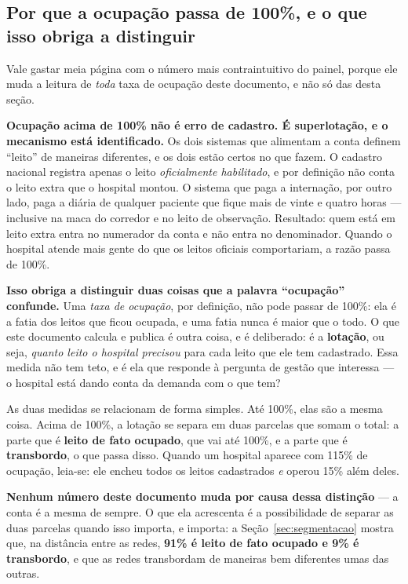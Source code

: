 \subsection*{Por que a ocupação passa de 100\%, e o que isso obriga a
distinguir}
\label{sub:lotacao}

Vale gastar meia página com o número mais contraintuitivo do painel, porque
ele muda a leitura de \emph{toda} taxa de ocupação deste documento, e não só
das desta seção.

\textbf{Ocupação acima de 100\% não é erro de cadastro. É superlotação, e o
mecanismo está identificado.} Os dois sistemas que alimentam a conta
definem ``leito'' de maneiras diferentes, e os dois estão certos no que
fazem. O cadastro nacional registra apenas o leito \emph{oficialmente
habilitado}, e por definição não conta o leito extra que o hospital montou.
O sistema que paga a internação, por outro lado, paga a diária de qualquer
paciente que fique mais de vinte e quatro horas --- inclusive na maca do
corredor e no leito de observação. Resultado: quem está em leito extra entra
no numerador da conta e não entra no denominador. Quando o hospital atende
mais gente do que os leitos oficiais comportariam, a razão passa de 100\%.

\textbf{Isso obriga a distinguir duas coisas que a palavra ``ocupação''
confunde.} Uma \emph{taxa de ocupação}, por definição, não pode passar de
100\%: ela é a fatia dos leitos que ficou ocupada, e uma fatia nunca é maior
que o todo. O que este documento calcula e publica é outra coisa, e é
deliberado: é a \textbf{lotação}, ou seja, \emph{quanto leito o hospital
precisou} para cada leito que ele tem cadastrado. Essa medida não tem teto,
e é ela que responde à pergunta de gestão que interessa --- o hospital está
dando conta da demanda com o que tem?

As duas medidas se relacionam de forma simples. Até 100\%, elas são a mesma
coisa. Acima de 100\%, a lotação se separa em duas parcelas que somam o
total: a parte que é \textbf{leito de fato ocupado}, que vai até 100\%, e a
parte que é \textbf{transbordo}, o que passa disso. Quando um hospital
aparece com 115\% de ocupação, leia-se: ele encheu todos os leitos
cadastrados \emph{e} operou 15\% além deles.

\textbf{Nenhum número deste documento muda por causa dessa distinção} --- a
conta é a mesma de sempre. O que ela acrescenta é a possibilidade de separar
as duas parcelas quando isso importa, e importa: a
Seção~\ref{sec:segmentacao} mostra que, na distância entre as redes,
\textbf{91\% é leito de fato ocupado e 9\% é transbordo}, e que as redes
transbordam de maneiras bem diferentes umas das outras.


